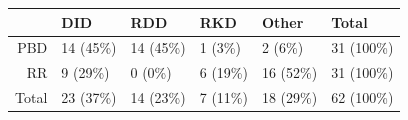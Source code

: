 

\begin{tabular}{rlllll}
  \hline
 & DID & RDD & RKD & Other & Total \\ 
  \hline
PBD & 14 (45\%) & 14 (45\%) & 1 (3\%) & 2 (6\%) & 31 (100\%) \\ 
  RR & 9 (29\%) & 0 (0\%) & 6 (19\%) & 16 (52\%) & 31 (100\%) \\ 
  Total & 23 (37\%) & 14 (23\%) & 7 (11\%) & 18 (29\%) & 62 (100\%) \\ 
   \hline
\end{tabular}


